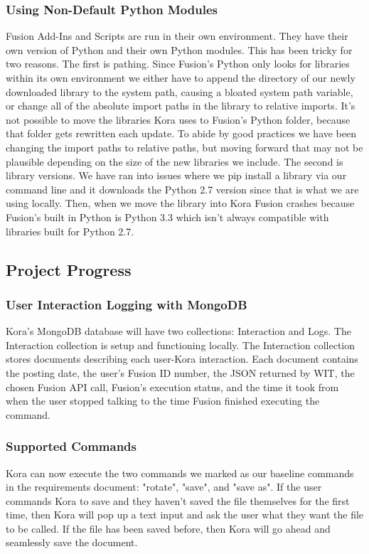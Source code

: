 \documentclass[onecolumn, draftclsnofoot,10pt, compsoc]{IEEEtran}
\begin{document}
    
	    \subsubsection{Using Non-Default Python Modules}
		    Fusion Add-Ins and Scripts are run in their own environment.
		    They have their own version of Python and their own Python modules.
		    This has been tricky for two reasons.
		    The first is pathing.
		    Since Fusion's Python only looks for libraries within its own environment we either have to append the directory of our newly downloaded library to the system path, causing a bloated system path variable, or change all of the absolute import paths in the library to relative imports.
		    It's not possible to move the libraries Kora uses to Fusion's Python folder, because that folder gets rewritten each update.
		    To abide by good practices we have been changing the import paths to relative paths, but moving forward that may not be plausible depending on the size of the new libraries we include.
		    The second is library versions.
		    We have ran into issues where we pip install a library via our command line and it downloads the Python 2.7 version since that is what we are using locally.
		    Then, when we move the library into Kora Fusion crashes because Fusion's built in Python is Python 3.3 which isn't always compatible with libraries built for Python 2.7.

		
	\subsection{Project Progress}
		\subsubsection{User Interaction Logging with MongoDB}
			Kora's MongoDB database will have two collections: Interaction and Logs.
			The Interaction collection is setup and functioning locally.
			The Interaction collection stores documents describing each user-Kora interaction.
			Each document contains the posting date, the user's Fusion ID number, the JSON returned by WIT, the chosen Fusion API call, Fusion's execution status, and the time it took from when the user stopped talking to the time Fusion finished executing the command.
			
			
		\subsubsection{Supported Commands}
			Kora can now execute the two commands we marked as our baseline commands in the requirements document: "rotate", "save", and "save as".
			If the user commands Kora to save and they haven't saved the file themselves for the first time, then Kora will pop up a text input and ask the user what they want the file to be called.
			If the file has been saved before, then Kora will go ahead and seamlessly save the document.
			
\end{document}
